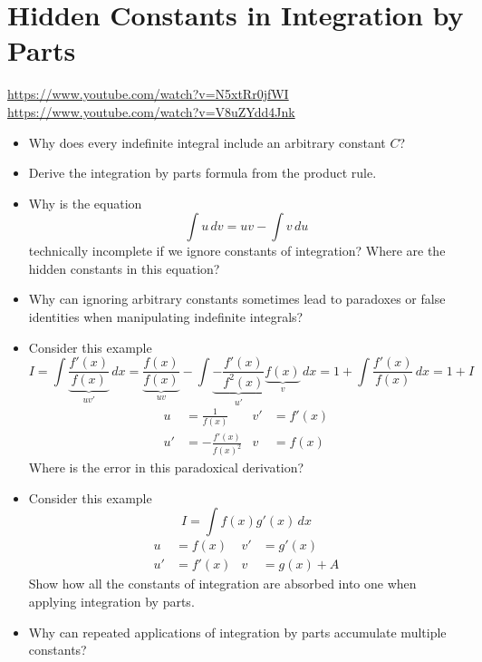 \section*{Hidden Constants in Integration by Parts}

\url{https://www.youtube.com/watch?v=N5xtRr0jfWI} \\
\url{https://www.youtube.com/watch?v=V8uZYdd4Jnk}

\begin{itemize}

\item Why does every indefinite integral include an arbitrary constant $C$?

\item Derive the integration by parts formula from the product rule.

\item Why is the equation
  \[
    \int u\,dv = uv - \int v\,du
  \]
  technically incomplete if we ignore constants of integration? Where are the hidden constants in this equation?

\item Why can ignoring arbitrary constants sometimes lead to paradoxes or false identities when manipulating indefinite integrals?

\item Consider this example
  \[
    I = \int \underbrace{\frac{f'(x)}{f(x)}}_{uv'} \, dx =
      \underbrace{\frac{f(x)}{f(x)}}_{uv} - \int \underbrace{-\frac{f'(x)}{f^2(x)}}_{u'} \underbrace{f(x)}_{v} \, dx =
      1 + \int \frac{f'(x)}{f(x)} \, dx =
      1 + I
  \]
  \begin{align*}
    u  &= \frac{1}{f(x)}        & v' &= f'(x) \\
    u' &= -\frac{f'(x)}{f(x)^2} & v  &= f(x)
  \end{align*}
  Where is the error in this paradoxical derivation?

\item Consider this example
  \[
    I = \int f(x)g'(x) \, dx
  \]
  \begin{align*}
    u  &= f(x)  & v' &= g'(x) \\
    u' &= f'(x) & v  &= g(x) + A
  \end{align*}
  Show how all the constants of integration are absorbed into one when applying integration by parts.

\item Why can repeated applications of integration by parts accumulate multiple constants?


\end{itemize}

